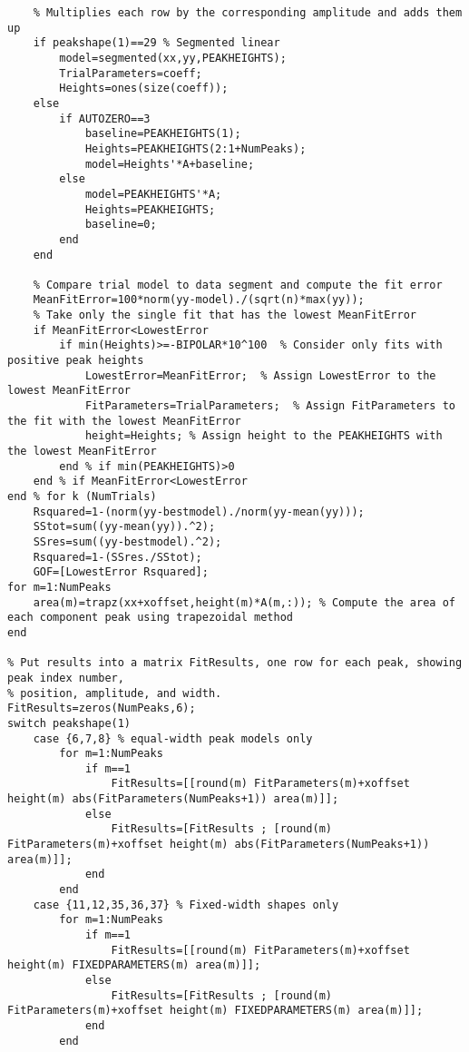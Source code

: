 \begin{lstlisting}
    % Multiplies each row by the corresponding amplitude and adds them up
    if peakshape(1)==29 % Segmented linear
        model=segmented(xx,yy,PEAKHEIGHTS);
        TrialParameters=coeff;
        Heights=ones(size(coeff));
    else
        if AUTOZERO==3
            baseline=PEAKHEIGHTS(1);
            Heights=PEAKHEIGHTS(2:1+NumPeaks);
            model=Heights'*A+baseline;
        else
            model=PEAKHEIGHTS'*A;
            Heights=PEAKHEIGHTS;
            baseline=0;
        end
    end
    
    % Compare trial model to data segment and compute the fit error
    MeanFitError=100*norm(yy-model)./(sqrt(n)*max(yy));
    % Take only the single fit that has the lowest MeanFitError
    if MeanFitError<LowestError
        if min(Heights)>=-BIPOLAR*10^100  % Consider only fits with positive peak heights
            LowestError=MeanFitError;  % Assign LowestError to the lowest MeanFitError
            FitParameters=TrialParameters;  % Assign FitParameters to the fit with the lowest MeanFitError
            height=Heights; % Assign height to the PEAKHEIGHTS with the lowest MeanFitError
        end % if min(PEAKHEIGHTS)>0
    end % if MeanFitError<LowestError
end % for k (NumTrials)
    Rsquared=1-(norm(yy-bestmodel)./norm(yy-mean(yy)));
    SStot=sum((yy-mean(yy)).^2);
    SSres=sum((yy-bestmodel).^2);
    Rsquared=1-(SSres./SStot);
    GOF=[LowestError Rsquared];
for m=1:NumPeaks
    area(m)=trapz(xx+xoffset,height(m)*A(m,:)); % Compute the area of each component peak using trapezoidal method
end

% Put results into a matrix FitResults, one row for each peak, showing peak index number,
% position, amplitude, and width.
FitResults=zeros(NumPeaks,6);
switch peakshape(1)
    case {6,7,8} % equal-width peak models only
        for m=1:NumPeaks
            if m==1
                FitResults=[[round(m) FitParameters(m)+xoffset height(m) abs(FitParameters(NumPeaks+1)) area(m)]];
            else
                FitResults=[FitResults ; [round(m) FitParameters(m)+xoffset height(m) abs(FitParameters(NumPeaks+1)) area(m)]];
            end
        end
    case {11,12,35,36,37} % Fixed-width shapes only
        for m=1:NumPeaks
            if m==1
                FitResults=[[round(m) FitParameters(m)+xoffset height(m) FIXEDPARAMETERS(m) area(m)]];
            else
                FitResults=[FitResults ; [round(m) FitParameters(m)+xoffset height(m) FIXEDPARAMETERS(m) area(m)]];
            end
        end


\end{lstlisting}
